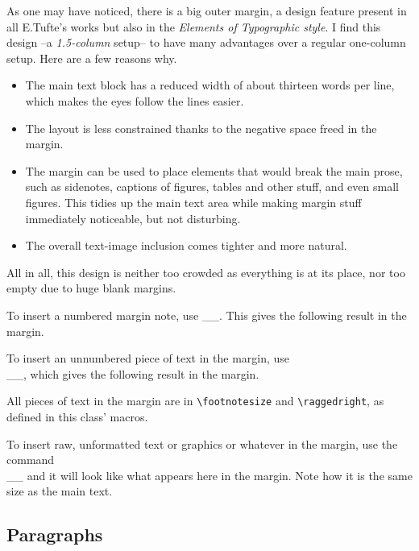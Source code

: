 \documentclass[
	raggedright,
	12pt,
	colorful,
]{tufte-style-article}
\begin{document}
As one may have noticed, there is a big outer margin, a design feature present in all E.Tufte's works but also in the \textit{Elements of Typographic style}. I find this design --a \textit{1.5-column} setup-- to have many advantages over a regular one-column setup. Here are a few reasons why.
\begin{itemize}\tightlist
	\item The main text block has a reduced width of about thirteen words per line, which makes the eyes follow the lines easier.

	\item The layout is less constrained thanks to the negative space freed in the margin.

	\item The margin can be used to place elements that would break the main prose, such as sidenotes, captions of figures, tables and other stuff, and even small figures. This tidies up the main text area while making margin stuff immediately noticeable, but not disturbing.

	\item The overall text-image inclusion comes tighter and more natural.
\end{itemize}
All in all, this design is neither too crowded as everything is at its place, nor too empty due to huge blank margins.

To insert a numbered margin note, use __. This gives the following result in the margin.

To insert an unnumbered piece of text in the margin, use\\\noindent{}__, which gives the following result in the margin.

All pieces of text in the margin are in \texttt{\textbackslash footnotesize} and \texttt{\textbackslash raggedright}, as defined in this class' macros.

To insert raw, unformatted text or graphics or whatever in the margin, use the command\\ __ and it will look like what appears here in the margin. Note how it is the same size as the main text.

\subsection{Paragraphs}
\end{document}

